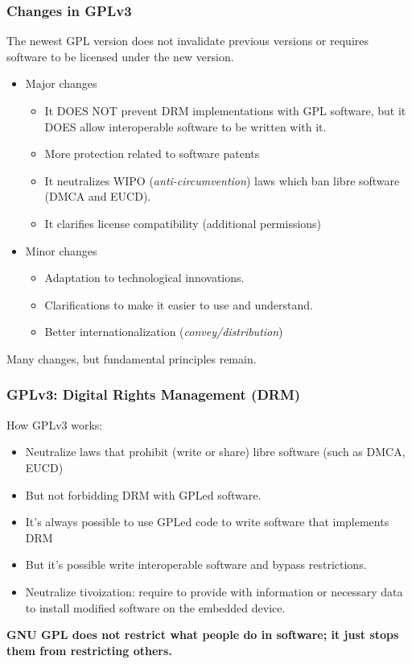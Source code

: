 \begin{frame}
\frametitle{Changes in GPLv3}
The newest GPL version does not invalidate previous versions or requires software to be licensed under the new version.
\begin{itemize}
\item Major changes
    \begin{itemize}
        \item It DOES NOT prevent DRM implementations with GPL software, but it DOES allow interoperable software to be written with it.
        \item {More protection related to software patents}
        \item It neutralizes WIPO (\textit{anti-circumvention}) laws which ban libre software (DMCA and EUCD).
        \item It clarifies license compatibility (additional permissions)
    \end{itemize}
\item Minor changes
    \begin{itemize}
        \item Adaptation to technological innovations.
        \item Clarifications to make it easier to use and understand.
        \item Better internationalization (\textit{convey/distribution})
    \end{itemize}
\end{itemize}

\pause

Many changes, but fundamental principles remain.

\end{frame}




\begin{frame}
\frametitle{GPLv3: Digital Rights Management (DRM)}

How GPLv3 works:

\begin{itemize}
\item Neutralize laws that prohibit (write or share) libre software (such as DMCA, EUCD)
\item But not forbidding DRM with GPLed software.
\item It's always possible to use GPLed code to write software that implements DRM 
\item But it's possible write interoperable software and bypass restrictions. 
\item Neutralize tivoization: require to provide with information or necessary data to install modified software on the embedded device.
\end{itemize}

\textbf{GNU GPL does not restrict what people do in software; it just stops them from restricting others.}

\end{frame}

